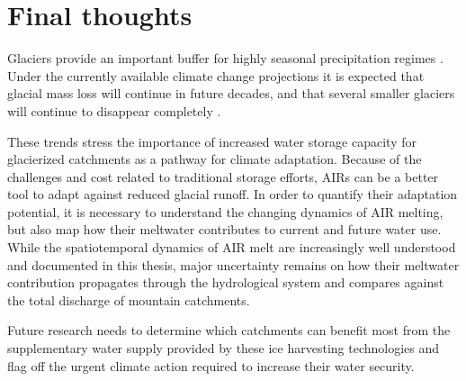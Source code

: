 \section{Final thoughts}

Glaciers provide an important buffer for highly seasonal precipitation regimes
\citep{kaserContributionPotentialGlaciers2010}. Under the currently available climate change projections it is
expected that glacial mass loss will continue in future decades, and that several smaller glaciers will continue
to disappear completely \citep{rabatelCurrentStateGlaciers2013}.

These trends stress the importance of increased water storage capacity for glacierized catchments as a pathway
for climate adaptation. Because of the challenges and cost related to traditional storage efforts, AIRs can be a
better tool to adapt against reduced glacial runoff. In order to quantify their adaptation potential, it is
necessary to understand the changing dynamics of AIR melting, but also map how their meltwater contributes to
current and future water use. While the spatiotemporal dynamics of AIR melt are increasingly well understood and
documented in this thesis, major uncertainty remains on how their meltwater contribution propagates through the
hydrological system and compares against the total discharge of mountain catchments.

Future research needs to determine which catchments can benefit most from the supplementary water supply
provided by these ice harvesting technologies and flag off the urgent climate action required to increase their
water security.





